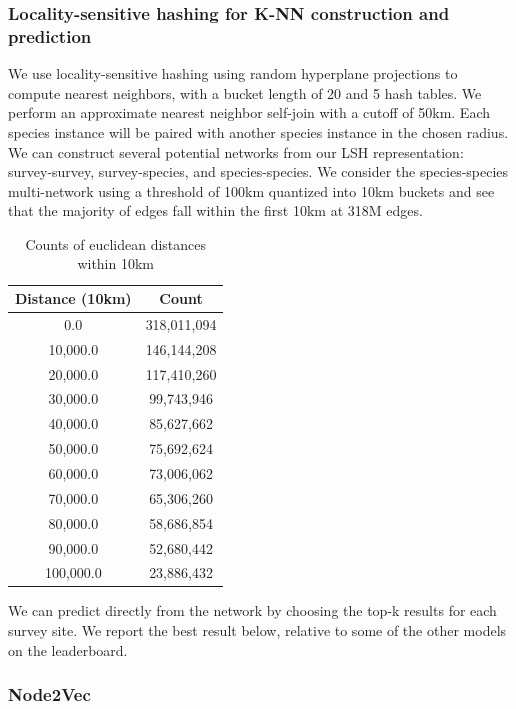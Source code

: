 \documentclass[]{style/ceurart}
\begin{document}
\subsubsection{Locality-sensitive hashing for K-NN construction and prediction}

We use locality-sensitive hashing using random hyperplane projections to compute nearest neighbors, with a bucket length of 20 and 5 hash tables. 
We perform an approximate nearest neighbor self-join with a cutoff of 50km. 
Each species instance will be paired with another species instance in the chosen radius. 
We can construct several potential networks from our LSH representation: survey-survey, survey-species, and species-species. 
We consider the species-species multi-network using a threshold of 100km quantized into 10km buckets and see that the majority of edges fall within the first 10km at 318M edges.

\begin{table}
    \centering
    \caption{Counts of euclidean distances within 10km}
    \begin{tabular}{|c|c|}
        \hline
        \textbf{Distance (10km)} & \textbf{Count} \\
        \hline
        0.0 & 318,011,094 \\
        10,000.0 & 146,144,208 \\
        20,000.0 & 117,410,260 \\
        30,000.0 & 99,743,946 \\
        40,000.0 & 85,627,662 \\
        50,000.0 & 75,692,624 \\
        60,000.0 & 73,006,062 \\
        70,000.0 & 65,306,260 \\
        80,000.0 & 58,686,854 \\
        90,000.0 & 52,680,442 \\
        100,000.0 & 23,886,432 \\
        \hline
    \end{tabular}
\end{table}

We can predict directly from the network by choosing the top-k results for each survey site. 
We report the best result below, relative to some of the other models on the leaderboard.

\subsubsection{Node2Vec}
\end{document}
